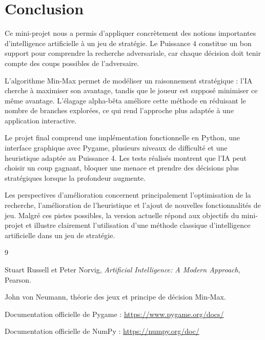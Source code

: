 \documentclass[12pt,a4paper]{article}
\begin{document}
\section{Conclusion}

Ce mini-projet nous a permis d'appliquer concrètement des notions importantes d'intelligence artificielle à un jeu de stratégie. Le Puissance 4 constitue un bon support pour comprendre la recherche adversariale, car chaque décision doit tenir compte des coups possibles de l'adversaire.

L'algorithme Min-Max permet de modéliser un raisonnement stratégique : l'IA cherche à maximiser son avantage, tandis que le joueur est supposé minimiser ce même avantage. L'élagage alpha-bêta améliore cette méthode en réduisant le nombre de branches explorées, ce qui rend l'approche plus adaptée à une application interactive.

Le projet final comprend une implémentation fonctionnelle en Python, une interface graphique avec Pygame, plusieurs niveaux de difficulté et une heuristique adaptée au Puissance 4. Les tests réalisés montrent que l'IA peut choisir un coup gagnant, bloquer une menace et prendre des décisions plus stratégiques lorsque la profondeur augmente.

Les perspectives d'amélioration concernent principalement l'optimisation de la recherche, l'amélioration de l'heuristique et l'ajout de nouvelles fonctionnalités de jeu. Malgré ces pistes possibles, la version actuelle répond aux objectifs du mini-projet et illustre clairement l'utilisation d'une méthode classique d'intelligence artificielle dans un jeu de stratégie.

\newpage
\begin{thebibliography}{9}

Stuart Russell et Peter Norvig, \textit{Artificial Intelligence: A Modern Approach}, Pearson.

John von Neumann, théorie des jeux et principe de décision Min-Max.

Documentation officielle de Pygame : \url{https://www.pygame.org/docs/}

Documentation officielle de NumPy : \url{https://numpy.org/doc/}

\end{thebibliography}
\end{document}
